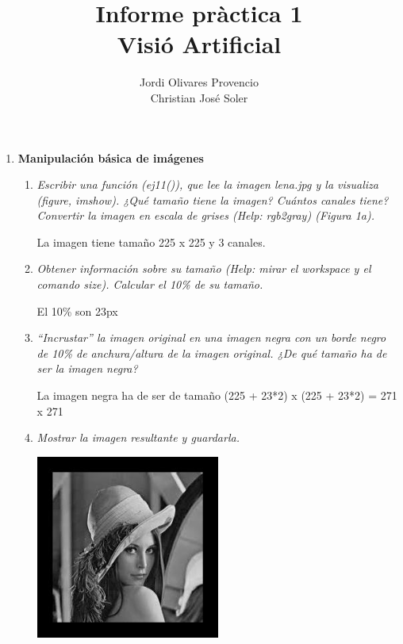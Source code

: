 \documentclass{article}
\title{Informe pràctica 1\\Visió Artificial}
\author{Jordi Olivares Provencio\\Christian José Soler}
\begin{document}
\maketitle

\begin{enumerate}

 \item \textbf{Manipulación básica de imágenes}

 \begin{enumerate}

 \item \textit{Escribir una función (ej11()), que lee la imagen lena.jpg y la visualiza (figure,
imshow). ¿Qué tamaño tiene la imagen? Cuántos canales tiene? Convertir la
imagen en escala de grises (Help: rgb2gray) (Figura 1a). }

 La imagen tiene tamaño 225 x 225 y 3 canales.

 \item \textit{Obtener información sobre su tamaño (Help: mirar el workspace y el comando
size). Calcular el 10\% de su tamaño.}

 El 10\% son 23px

 \item \textit{“Incrustar” la imagen original en una imagen negra con un borde negro de
10\% de anchura/altura de la imagen original. ¿De qué tamaño ha de ser la
imagen negra?}

 La imagen negra ha de ser de tamaño (225 + 23*2) x (225 + 23*2) = 271 x 271

 \item \textit{Mostrar la imagen resultante y guardarla.}

 \begin{center}
 \includegraphics[width=0.5\textwidth]{lena_frame.jpg}
 \end{center}

 \end{enumerate}


\end{enumerate}
\end{document}
